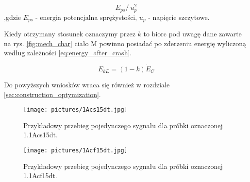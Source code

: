   
\begin{equation}
E_{ps} /~ u_{p}^2
\label{eq:energy_prop}
\end{equation}
,gdzie $E_{ps}$ - energia potencjalna sprężystości, $u_{p}$ - napięcie szczytowe.

\indent Kiedy otrzymany stosunek oznaczymy przez $k$ to biorc pod uwagę dane zawarte na
rys. \ref{fig:mech_char} ciało M powinno posiadać po zderzeniu energię wyliczoną według
zależności \ref{eq:energy_after_crash}.


\begin{equation}
E_{kE} = (1-k)\dot E_C
\label{eq:energy_after_crash}
\end{equation}

\indent Do powyższych wniosków wraca się również w rozdziale \ref{sec:construction_optymization}.

\begin{figure}[tbph]
\centering
\texttt{[image: pictures/1Acs15dt.jpg]}
\caption{Przykładowy przebieg pojedynczego sygnału dla próbki oznaczonej 1.1Acs15dt.}
\label{fig:scope_without_silencer}
\end{figure}

\begin{figure}[tbph]
\centering
\texttt{[image: pictures/1Acf15dt.jpg]}
\caption{Przykładowy przebieg pojedynczego sygnału dla próbki oznaczonej 1.1Acf15dt.}
\label{fig:scope_with_silencer}
\end{figure}
